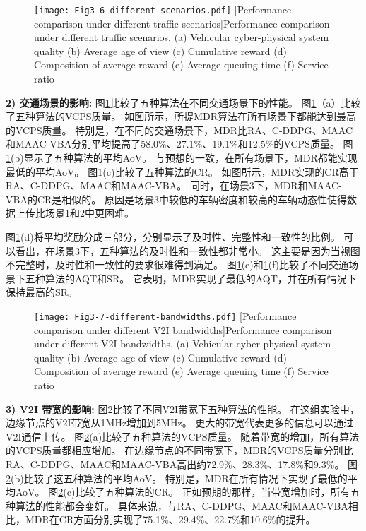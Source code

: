 \begin{figure}[h]
  \centering
  \texttt{[image: Fig3-6-different-scenarios.pdf]}
  [Performance comparison under different traffic scenarios]{Performance comparison under different traffic scenarios. (a) Vehicular cyber-physical system quality (b) Average age of view (c) Cumulative reward (d) Composition of average reward (e) Average queuing time (f) Service ratio}
  \label{fig 3-6}
\end{figure}

\textbf{2) 交通场景的影响:}
图\ref{fig 3-6}比较了五种算法在不同交通场景下的性能。
图\ref{fig 3-6}（a）比较了五种算法的VCPS质量。
如图所示，所提MDR算法在所有场景下都能达到最高的VCPS质量。
特别是，在不同的交通场景下，MDR比RA、C-DDPG、MAAC和MAAC-VBA分别平均提高了58.0\%、27.1\%、19.1\%和12.5\%的VCPS质量。
图\ref{fig 3-6}(b)显示了五种算法的平均AoV。
与预想的一致，在所有场景下，MDR都能实现最低的平均AoV。
图\ref{fig 3-6}(c)比较了五种算法的CR。
如图所示，MDR实现的CR高于RA、C-DDPG、MAAC和MAAC-VBA。
同时，在场景3下，MDR和MAAC-VBA的CR是相似的。
原因是场景3中较低的车辆密度和较高的车辆动态性使得数据上传比场景1和2中更困难。

图\ref{fig 3-6}(d)将平均奖励分成三部分，分别显示了及时性、完整性和一致性的比例。
可以看出，在场景3下，五种算法的及时性和一致性都非常小。
这主要是因为当视图不完整时，及时性和一致性的要求很难得到满足。
图\ref{fig 3-6}(e)和\ref{fig 3-6}(f)比较了不同交通场景下五种算法的AQT和SR。
它表明，MDR实现了最低的AQT，并在所有情况下保持最高的SR。

\begin{figure}[h]
  \centering
  \texttt{[image: Fig3-7-different-bandwidths.pdf]}
  [Performance comparison under different V2I bandwidths]{Performance comparison under different V2I bandwidths. (a) Vehicular cyber-physical system quality (b) Average age of view (c) Cumulative reward (d) Composition of average reward (e) Average queuing time (f) Service ratio}
  \label{fig 3-7}
\end{figure}

\textbf{3) V2I 带宽的影响:}
图\ref{fig 3-7}比较了不同V2I带宽下五种算法的性能。
在这组实验中，边缘节点的V2I带宽从1MHz增加到5MHz。
更大的带宽代表更多的信息可以通过V2I通信上传。
图\ref{fig 3-7}(a)比较了五种算法的VCPS质量。
随着带宽的增加，所有算法的VCPS质量都相应增加。
在边缘节点的不同带宽下，MDR的VCPS质量分别比RA、C-DDPG、MAAC和MAAC-VBA高出约72.9\%、28.3\%、17.8\%和9.3\%。
图\ref{fig 3-7}(b)比较了这五种算法的平均AoV。
特别是，MDR在所有情况下实现了最低的平均AoV。
图\ref{fig 3-7}(c)比较了五种算法的CR。
正如预期的那样，当带宽增加时，所有五种算法的性能都会变好。
具体来说，与RA、C-DDPG、MAAC和MAAC-VBA相比，MDR在CR方面分别实现了75.1\%、29.4\%、22.7\%和10.6\%的提升。

